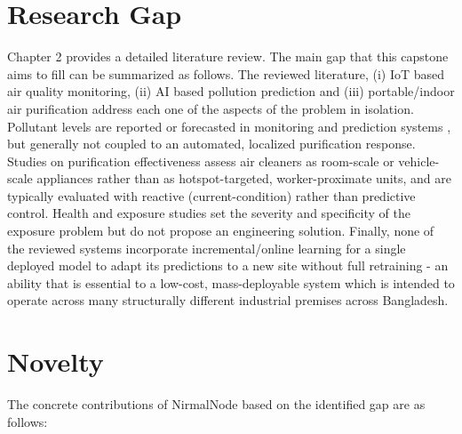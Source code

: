 \section{Research Gap}
\label{sec:research-gap}

Chapter 2 provides a detailed literature review. The main gap that this capstone aims to fill can be summarized as follows. The reviewed literature, (i) IoT based air quality monitoring, (ii) AI based pollution prediction and (iii) portable/indoor air purification address each one of the aspects of the problem in isolation. Pollutant levels are reported or forecasted in monitoring and prediction systems \citep{alam2025iot,zhang2020realtime,kataria2022aiiot,mani2021aipowered,islam2025dhaka}, but generally not coupled to an automated, localized purification response. Studies on purification effectiveness \citep{dubey2021assessing,lu2023realworld,cox2018effectiveness,chen2022efficacy,lee2022effect,chen2025fine,szczotko2022review} assess air cleaners as room-scale or vehicle-scale appliances rather than as hotspot-targeted, worker-proximate units, and are typically evaluated with reactive (current-condition) rather than predictive control. Health and exposure studies \citep{nasri2023pm25,sekhavati2023particulate,alhadhrami2024pm25mental,rahman2025perceived} set the severity and specificity of the exposure problem but do not propose an engineering solution. Finally, none of the reviewed systems incorporate incremental/online learning for a single deployed model to adapt its predictions to a new site without full retraining - an ability that is essential to a low-cost, mass-deployable system which is intended to operate across many structurally different industrial premises across Bangladesh.

\section{Novelty}
\label{sec:novelty}

The concrete contributions of NirmalNode based on the identified gap are as follows:

